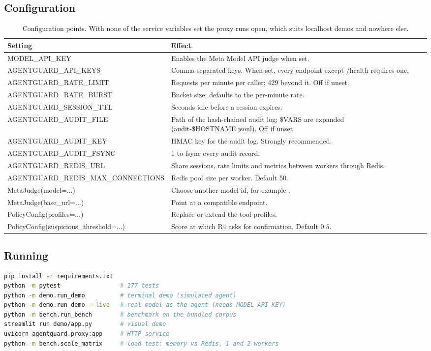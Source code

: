 \documentclass[11pt,a4paper]{article}
\newcommand{\code}[1]{\texttt{\detokenize{#1}}}
\begin{document}
\subsection{Configuration}\label{tab:config}
\begin{table}[H]
\centering
\begin{tabularx}{\linewidth}{@{}>{\ttfamily\footnotesize}p{7.7cm}Y@{}}
\toprule
Setting & Effect \\
\midrule
MODEL\_API\_KEY & Enables the Meta Model API judge when set. \\
AGENTGUARD\_API\_KEYS & Comma-separated keys. When set, every endpoint except /health requires one. \\
AGENTGUARD\_RATE\_LIMIT & Requests per minute per caller; 429 beyond it. Off if unset. \\
AGENTGUARD\_RATE\_BURST & Bucket size; defaults to the per-minute rate. \\
AGENTGUARD\_SESSION\_TTL & Seconds idle before a session expires. \\
AGENTGUARD\_AUDIT\_FILE & Path of the hash-chained audit log; \$VARS are expanded (audit-\$HOSTNAME.jsonl). Off if unset. \\
AGENTGUARD\_AUDIT\_KEY & HMAC key for the audit log. Strongly recommended. \\
AGENTGUARD\_AUDIT\_FSYNC & 1 to fsync every audit record. \\
AGENTGUARD\_REDIS\_URL & Share sessions, rate limits and metrics between workers through Redis. \\
AGENTGUARD\_REDIS\_MAX\_CONNECTIONS & Redis pool size per worker. Default 50. \\
MetaJudge(model=...) & Choose another model id, for example \code{muse-spark-1.2}. \\
MetaJudge(base\_url=...) & Point at a compatible endpoint. \\
PolicyConfig(profiles=...) & Replace or extend the tool profiles. \\
PolicyConfig(suspicious\_threshold=...) & Score at which R4 asks for confirmation. Default $0.5$. \\
\bottomrule
\end{tabularx}
\caption{Configuration points. With none of the service variables set the proxy runs open, which suits localhost demos and nowhere else.}
\end{table}

\subsection{Running}
\begin{lstlisting}[language=bash]
pip install -r requirements.txt
python -m pytest                 # 177 tests
python -m demo.run_demo          # terminal demo (simulated agent)
python -m demo.run_demo --live   # real model as the agent (needs MODEL_API_KEY)
python -m bench.run_bench        # benchmark on the bundled corpus
streamlit run demo/app.py        # visual demo
uvicorn agentguard.proxy:app     # HTTP service
python -m bench.scale_matrix     # load test: memory vs Redis, 1 and 2 workers
\end{lstlisting}
\end{document}
